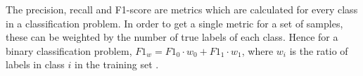 The precision, recall and F1-score are metrics which are calculated for every class in a classification problem. In order to get a single metric for a set of samples, these can be weighted by the number of true labels of each class. Hence for a binary classification problem, $F1_w = F1_0 \cdot w_0 + F1_1 \cdot w_1$, where $w_i$ is the ratio of labels in class $i$ in the training set \citep{Ting2017}. 

